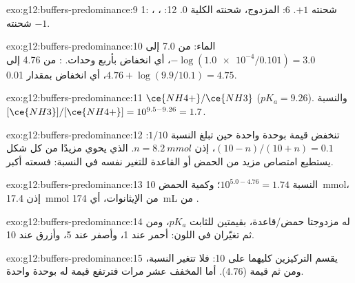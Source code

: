 \begin{solution}{exo:g12:buffers-predominance:9}
 1:  ، شحنته $+1$.  6:  المزدوج،
شحنته الكلية 0.  12:  ، شحنته $-1$.
\end{solution}

\begin{solution}{exo:g12:buffers-predominance:10}
الماء: من 7.0 إلى $-\log(\num{1.0e-4}/0.101) = 3.0$، أي انخفاض بأربع وحدات.
: من 4.76 إلى $4.76 + \log(9.9/10.1) = 4.75$، أي انخفاض بمقدار 0.01.
\end{solution}

\begin{solution}{exo:g12:buffers-predominance:11}
$\ce{NH4+}/\ce{NH3}$ ($pK_a = 9.26$). والنسبة
$[\ce{NH3}]/[\ce{NH4+}] = 10^{9.5 - 9.26} = 1.7$.
\end{solution}

\begin{solution}{exo:g12:buffers-predominance:12}
تنخفض قيمة  بوحدة واحدة حين تبلغ النسبة $1/10$:
$(10 - n)/(10 + n) = 0.1$، إذن $n = \qty{8.2}{mmol}$.  الذي يحوي مزيدًا
من كل شكل يستطيع امتصاص مزيد من الحمض أو القاعدة للتغير نفسه في
النسبة: فسعته أكبر.
\end{solution}

\begin{solution}{exo:g12:buffers-predominance:13}
النسبة $10^{5.0 - 4.76} = 1.74$؛ وكمية الحمض \qty{10}{mmol}، إذن
\qty{17.4}{mmol} من الإيثانوات، أي \qty{174}{mL} من .
\end{solution}

\begin{solution}{exo:g12:buffers-predominance:14}
له مزدوجتا حمض/قاعدة، بقيمتين للثابت $pK_a$، ومن ثم تغيّران في
اللون: أحمر عند  1، وأصفر عند  5، وأزرق عند  10.
\end{solution}

\begin{solution}{exo:g12:buffers-predominance:15}
 يقسم التركيزين كليهما على 10: فلا تتغير النسبة، ومن ثم قيمة 
(4.76). أما  المخفف عشر مرات فترتفع قيمة  له بوحدة
واحدة.
\end{solution}

